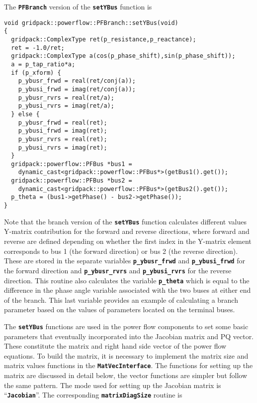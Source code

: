 The \texttt{\textbf{PFBranch}} version of the \texttt{\textbf{setYBus}} function is

{
\color{red}
\begin{Verbatim}[fontseries=b]
void gridpack::powerflow::PFBranch::setYBus(void)
{
  gridpack::ComplexType ret(p_resistance,p_reactance);
  ret = -1.0/ret;
  gridpack::ComplexType a(cos(p_phase_shift),sin(p_phase_shift));
  a = p_tap_ratio*a;
  if (p_xform) {
    p_ybusr_frwd = real(ret/conj(a));
    p_ybusi_frwd = imag(ret/conj(a));
    p_ybusr_rvrs = real(ret/a);
    p_ybusi_rvrs = imag(ret/a);
  } else {
    p_ybusr_frwd = real(ret);
    p_ybusi_frwd = imag(ret);
    p_ybusr_rvrs = real(ret);
    p_ybusi_rvrs = imag(ret);
  }
  gridpack::powerflow::PFBus *bus1 =
    dynamic_cast<gridpack::powerflow::PFBus*>(getBus1().get());
  gridpack::powerflow::PFBus *bus2 =
    dynamic_cast<gridpack::powerflow::PFBus*>(getBus2().get());
  p_theta = (bus1->getPhase() - bus2->getPhase());
}
\end{Verbatim}
}

Note that the branch version of the \texttt{\textbf{setYBus}} function
calculates different values Y-matrix contribution for the forward and reverse directions, where
forward and reverse are defined depending on whether the first index in the Y-matrix element corresponds to bus 1 (the forward direction) or bus 2 (the reverse direction). These are stored in the separate variables \texttt{\textbf{p\_ybusr\_frwd}} and \texttt{\textbf{p\_ybusi\_frwd}} for the forward direction and \texttt{\textbf{p\_ybusr\_rvrs}} and \texttt{\textbf{p\_ybusi\_rvrs}} for the reverse direction. This routine also calculates the variable \texttt{\textbf{p\_theta}} which is equal to the difference in the phase angle variable associated with the two buses at either end of the branch. This last variable provides an example of calculating a branch parameter based on the values of parameters located on the terminal buses.

The \texttt{\textbf{setYBus}} functions are used in the power flow components to
set some basic parameters that eventually incorporated into the Jacobian matrix
and PQ vector. These constitute the matrix and right hand side vector of the
power flow equations. To build the matrix, it is necessary to implement the
matrix size and matrix values functions in the
\texttt{\textbf{MatVecInterface}}. The functions for setting up the matrix are
discussed in detail below, the vector functions are simpler but follow the same pattern. The mode used for setting up the Jacobian matrix is ``\texttt{\textbf{Jacobian}}''. The corresponding \texttt{\textbf{matrixDiagSize}} routine is

